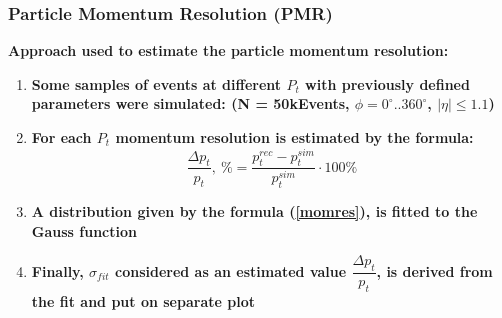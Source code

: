 \documentclass[svgnames] {beamer}
\begin{document}
\begin{frame}

  \frametitle{Particle Momentum Resolution (PMR)}

  \begin{block}{\textbf{Approach used to estimate the particle momentum resolution:}}
    \begin{enumerate}
  
    \item \textbf {Some samples of events at different $P_{t}$ with previously defined parameters were simulated:
       (N = 50kEvents, $\phi = 0^{\circ} .. 360^{\circ}$, $|\eta| \leq 1.1$)}

    \item \textbf {For each $P_{t}$ momentum resolution is estimated by the formula:
      \begin{equation}
        \label{momres}
      \dfrac{\Delta p_{t}}{p_{t}}, ~\% = \dfrac{p_{t}^{rec} - p_{t}^{sim}}{p_{t}^{sim}} \cdot 100\%
      \end{equation}
    }
    \item \textbf {A distribution given by the formula (\ref{momres}), is fitted to the Gauss function}

    \item \textbf {Finally, $\sigma_{fit}$ considered as an estimated value $\dfrac{\Delta p_{t}}{p_{t}}$, is derived from the fit and put on separate plot} 
      
    \end{enumerate}
  \end{block}
\end{frame}

\end{document}
